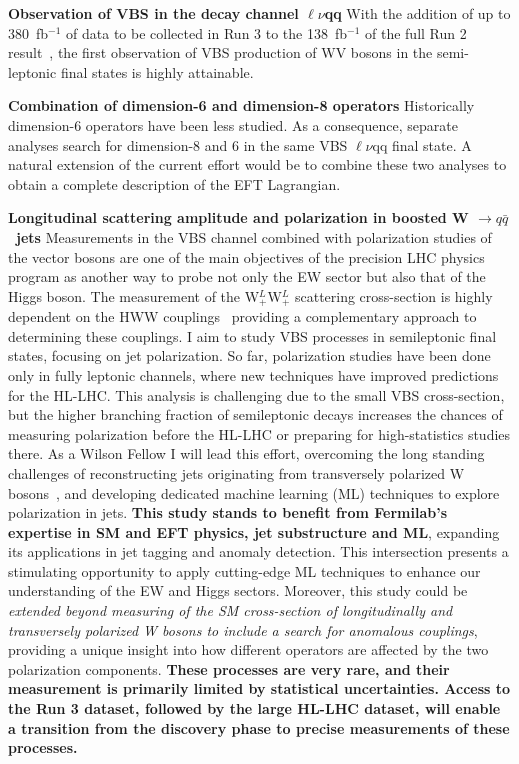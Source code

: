 {\begin{flushleft}
\textbf{Observation of VBS in the decay channel $\ell\nu$qq} With the addition of up to 380~fb$^{-1}$ of data to be collected in Run 3 to the 138~fb$^{-1}$ of the full Run 2 result~\cite{[1]}, the first observation of VBS production of WV bosons in the semi-leptonic final states is highly attainable.

\textbf{Combination of dimension-6 and dimension-8 operators} Historically dimension-6 operators have been less studied. As a consequence, separate analyses search for dimension-8 and 6 in the same VBS $\ell\nu$qq final state. A natural extension of the current effort would be to combine these two analyses to obtain a complete description of the EFT Lagrangian.

\textbf{Longitudinal scattering amplitude and polarization in boosted W $\to q\bar{q}$ \ jets}
Measurements in the VBS channel combined with polarization studies of the vector bosons are one of the main objectives of the precision LHC physics program as another way to probe not only the EW sector but also that of the Higgs boson.
The measurement of the  W$^L_+$W$^L_+$ scattering cross-section is highly dependent on the HWW couplings~\cite{[3]} providing a complementary approach to determining these couplings.
I aim to study VBS processes in semileptonic final states, focusing on jet polarization. So far, polarization studies have been done only in fully leptonic channels, where new techniques have improved predictions for the HL-LHC. This analysis is challenging due to the small VBS cross-section, but the higher branching fraction of semileptonic decays increases the chances of measuring polarization before the HL-LHC or preparing for high-statistics studies there. As a Wilson Fellow I will lead this effort, overcoming the long standing challenges of reconstructing jets originating from transversely polarized W bosons~\cite{[4]}, and developing dedicated machine learning (ML) techniques to explore polarization in jets.
\textbf{This study stands to benefit from Fermilab’s expertise in SM and EFT physics, jet substructure and ML}, expanding its applications in jet tagging and anomaly detection. This intersection presents a stimulating opportunity to apply cutting-edge ML techniques to enhance our understanding of the EW and Higgs sectors.
Moreover, this study could be {\em extended beyond measuring of the SM cross-section of longitudinally and transversely polarized W bosons to include a search for anomalous couplings}, providing a unique insight into how different operators are affected by the two polarization components.
{\bf These processes are very rare, and their measurement is primarily limited by statistical uncertainties. Access to the Run 3 dataset, followed by the large HL-LHC dataset, will enable a transition from the discovery phase to precise measurements of these processes.}


\end{flushleft}}
